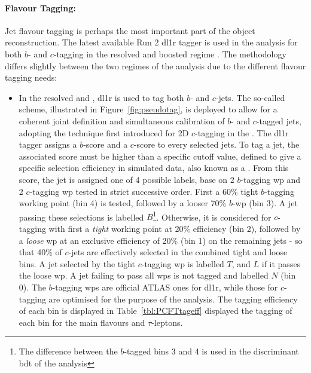 \paragraph{Flavour Tagging:} Jet flavour tagging is perhaps the most important part of the object reconstruction. The latest available Run 2 \gls{dl1r} tagger is used in the analysis for both $b$- and $c$-tagging in the resolved and boosted regime \cite{atlas:FTAGRUN2}. The methodology differs slightly between the two regimes of the analysis due to the different flavour tagging needs: 
\begin{itemize}
  \item In the resolved \vhb and \vhc, \gls{dl1r} is used to tag both $b$- and $c$-jets. The so-called  scheme, illustrated in Figure~\ref{fig:pseudotag}, is deployed to allow for a coherent joint definition and simultaneous calibration of $b$- and $c$-tagged jets, adopting the technique first introduced for 2D $c$-tagging in the \vhc \cite{Collaboration:2721696}. The \gls{dl1r} tagger assigns a $b$-score and a $c$-score to every selected jets. To tag a jet, the associated score must be higher than a specific cutoff value, defined to give a specific selection efficiency in simulated data, also known as a . From this score, the jet is assigned one of 4 possible labels, base on 2 $b$-tagging \gls{wp} and 2 $c$-tagging \gls{wp} tested in strict successive order. First a 60\% tight $b$-tagging working point (bin 4) is tested, followed by a looser 70\% $b$-\gls{wp} (bin 3). A jet passing these selections is labelled $B$\footnote{The difference between the $b$-tagged bins 3 and 4 is used in the discriminant \gls{bdt} of the analysis}. Otherwise, it is considered for $c$-tagging with first a \textit{tight} working point at 20\% efficiency (bin 2), followed by a \textit{loose} \gls{wp} at an exclusive efficiency of 20\% (bin 1) on the remaining jets - so that 40\% of $c$-jets are effectively selected in the combined tight and loose bins. A jet selected by the tight $c$-tagging \gls{wp} is labelled $T$, and $L$ if it passes the loose \gls{wp}. A jet failing to pass all \gls{wp}s is not tagged and labelled $N$ (bin 0). The $b$-tagging \gls{wp}s are official ATLAS ones for \gls{dl1r}, while those for $c$-tagging are optimised for the purpose of the analysis. The tagging efficiency of each bin is displayed in Table~\ref{tbl:PCFTtageff} displayed the tagging of each bin for the main flavours and $\tau$-leptons.
  \begin{table}[h!]
    \begin{center}

\end{center}
\end{table}
\end{itemize}
